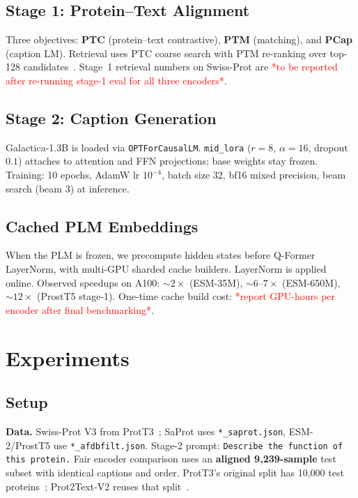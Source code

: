 \documentclass{article}
\newcommand{\tbd}[1]{\textcolor{red}{*#1*}}
\begin{document}
\subsection{Stage 1: Protein--Text Alignment}

Three objectives: \textbf{PTC} (protein--text contrastive), \textbf{PTM} (matching), and \textbf{PCap} (caption LM).
Retrieval uses PTC coarse search with PTM re-ranking over top-128 candidates~\cite{liu2024prott3}.
Stage~1 retrieval numbers on Swiss-Prot are \tbd{to be reported after re-running stage-1 eval for all three encoders}.

\subsection{Stage 2: Caption Generation}

Galactica-1.3B is loaded via \texttt{OPTForCausalLM}.
\texttt{mid\_lora} ($r{=}8$, $\alpha{=}16$, dropout $0.1$) attaches to attention and FFN projections; base weights stay frozen.
Training: 10 epochs, AdamW lr $10^{-4}$, batch size 32, bf16 mixed precision, beam search (beam 3) at inference.

\subsection{Cached PLM Embeddings}

When the PLM is frozen, we precompute hidden states before Q-Former LayerNorm, with multi-GPU sharded cache builders.
LayerNorm is applied online.
Observed speedups on A100: $\sim 2\times$ (ESM-35M), $\sim 6$--$7\times$ (ESM-650M), $\sim 12\times$ (ProstT5 stage-1).
One-time cache build cost: \tbd{report GPU-hours per encoder after final benchmarking}.

\section{Experiments}
\label{sec:experiments}

\subsection{Setup}

\textbf{Data.}
Swiss-Prot V3 from ProtT3~\cite{liu2024prott3}; SaProt uses \texttt{*\_saprot.json}, ESM-2/ProstT5 use \texttt{*\_afdbfilt.json}.
Stage-2 prompt: \texttt{Describe the function of this protein.}
Fair encoder comparison uses an \textbf{aligned 9{,}239-sample} test subset with identical captions and order.
ProtT3's original split has 10{,}000 test proteins~\cite{liu2024prott3}; Prot2Text-V2 reuses that split~\cite{fei2025prot2text}.
\end{document}
